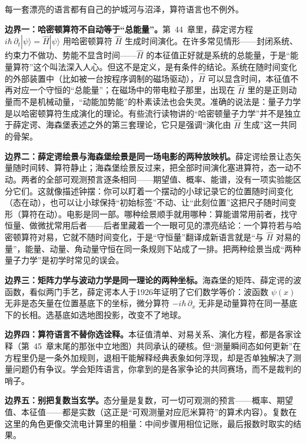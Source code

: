
每一套漂亮的语言都有自己的护城河与沼泽，算符语言也不例外。

\textbf{边界一：哈密顿算符不自动等于“总能量”。}第~44~章里，薛定谔方程 $i\hbar\,\partial_t|\psi\rangle=\hat{H}|\psi\rangle$ 用哈密顿算符 $\hat{H}$ 生成时间演化。在许多常见情形——封闭系统、约束力不做功、势能不显含时间——$\hat{H}$ 的本征值正好就是系统的总能量，于是“能量算符”这个叫法深入人心。但这不是定义，是有条件的结论。系统在随时间变化的外部装置中（比如被一台按程序调制的磁场驱动），$\hat{H}$ 可以显含时间，本征值不再对应一个守恒的“总能量”；在磁场中的带电粒子那里，出现在 $\hat{H}$ 里的是正则动量而不是机械动量，“动能加势能”的朴素读法也会失灵。准确的说法是：量子力学是以哈密顿算符生成演化的理论。有些流行读物讲的“哈密顿量子力学”并不是独立于薛定谔、海森堡表述之外的第三套理论，它只是强调“演化由 $\hat{H}$ 生成”这一共同的骨架。

\textbf{边界二：薛定谔绘景与海森堡绘景是同一场电影的两种放映机。}薛定谔绘景让态矢量随时间转、算符静止；海森堡绘景反过来，把全部时间演化塞进算符，态一动不动。两者的全部可观测预言逐条相同——期望值、概率、能谱，没有一项实验能区分它们。这就像描述钟摆：你可以盯着一个摆动的小球记录它的位置随时间变化（态在动），也可以让小球保持“初始标签”不动、让“此刻位置”这把尺子随时间变形（算符在动）。电影是同一部。哪种绘景顺手就用哪种：算能谱常用前者，找守恒量、做微扰常用后者——后者里藏着一个一眼可见的漂亮结论：一个算符若与哈密顿算符对易，它就不随时间变化，于是“守恒量”翻译成新语言就是“与 $\hat{H}$ 对易的量”，能量、动量、角动量守恒在同一条规则下站成了一排。把两种绘景当成“两种量子力学”是初学时常见的误会。

\textbf{边界三：矩阵力学与波动力学是同一理论的两种坐标。}海森堡的矩阵、薛定谔的波函数，看似两门手艺，薛定谔本人于1926年证明了它们数学等价：波函数 $\psi(x)$ 无非是态矢量在位置基底下的坐标，微分算符 $-i\hbar\,\partial_x$ 无非是动量算符在同一基底下的长相。选基底如选地图投影，改变不了地球。

\textbf{边界四：算符语言不替你选诠释。}本征值清单、对易关系、演化方程，都是各家诠释（第~45~章末尾的那张中立地图）共同承认的硬核。但“测量瞬间态如何更新”在方程里仍是一条外加规则，退相干能解释经典表象如何浮现，却是否单独解决了测量问题仍有争议。学会矩阵语言，你拿到的是各家争论的共同赛场，而不是裁判的哨子。

\textbf{边界五：别把复数当玄学。}态分量是复数，可一切可观测的预言——概率、期望值、本征值——都是实数（这正是“可观测量对应厄米算符”的算术内容）。复数在这里的角色更像交流电计算里的相量：中间步骤用相位记账，最后报数时取实的结果。


